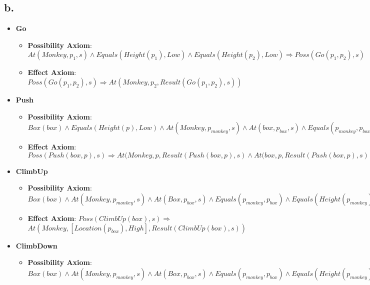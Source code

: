 \documentclass{article}
\begin{document}
        \subsection{b.}
            \begin{itemize}
                \item \textbf{Go}
                    \begin{itemize}
                        \item \textbf{Possibility Axiom}: $At(Monkey, p_1, s)\land Equals(Height(p_1), Low)\land Equals(Height(p_2), Low)\Rightarrow Poss(Go(p_1, p_2), s)$
                        \item \textbf{Effect Axiom}: $Poss(Go(p_1, p_2), s)\Rightarrow At(Monkey, p_2, Result(Go(p_1, p_2), s))$
                    \end{itemize}
                \item \textbf{Push}
                    \begin{itemize}
                        \item \textbf{Possibility Axiom}: $Box(box)\land Equals(Height(p), Low)\land At(Monkey,p_{monkey}, s)\land At(box, p_{box}, s)\land Equals(p_{monkey}, p_{box})\land Equals(Height(p_{monkey}), Low) \Rightarrow Poss(Push(box, p), s)$
                        \item \textbf{Effect Axiom}: $Poss(Push(box, p), s)\Rightarrow At(Monkey, p, Result(Push(box, p), s) \land At(box, p, Result(Push(box, p), s)$
                    \end{itemize}
                \item \textbf{ClimbUp}
                    \begin{itemize}
                        \item \textbf{Possibility Axiom}: $Box(box)\land At(Monkey, p_{monkey}, s)\land At(Box, p_{box}, s)\land Equals(p_{monkey}, p_{box})\land Equals(Height(p_{monkey}), Low)\Rightarrow Poss(ClimbUp(box), s)$
                        \item \textbf{Effect Axiom}: $Poss(ClimbUp(box), s)\Rightarrow$\\
                            $At(Monkey, [Location(p_{box}), High], Result(ClimbUp(box), s))$
                    \end{itemize}
                \item \textbf{ClimbDown}
                    \begin{itemize}
                        \item \textbf{Possibility Axiom}: $Box(box)\land At(Monkey, p_{monkey}, s)\land At(Box, p_{box}, s)\land Equals(p_{monkey}, p_{box})\land Equals(Height(p_{monkey}), High)\Rightarrow Poss(ClimbDown(box), s)$

\end{itemize}
\end{itemize}
\end{document}
